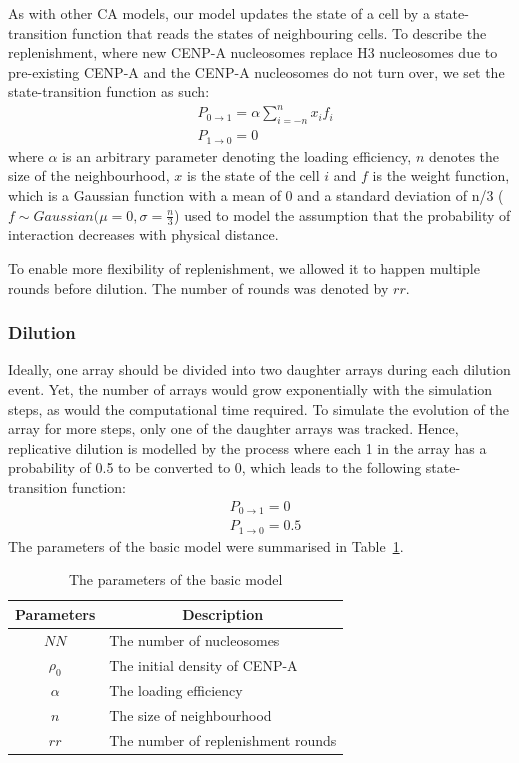 As with other CA models, our model updates the state of a cell by a state-transition function that reads the states of neighbouring cells. To describe the replenishment, where new CENP-A nucleosomes replace H3 nucleosomes due to pre-existing CENP-A and the CENP-A nucleosomes do not turn over, we set the state-transition function as such: 
\begin{align*}
    & P_{0\rightarrow 1}=\alpha\sum_{i=-n}^{n} x_if_i \\
    & P_{1\rightarrow 0}=0 
\end{align*}
where $\alpha$ is an arbitrary parameter denoting the loading efficiency, $n$ denotes the size of the neighbourhood, $x$ is the state of the cell $i$ and $f$ is the weight function, which is a Gaussian function with a mean of 0 and a standard deviation of n/3 ($f\sim Gaussian(\mu=0, \sigma=\frac{n}{3}$) used to model the assumption that the probability of interaction decreases with physical distance. 

To enable more flexibility of replenishment, we allowed it to happen multiple rounds before dilution. The number of rounds was denoted by $rr$. 

\subsubsection{Dilution}

Ideally, one array should be divided into two daughter arrays during each dilution event. Yet, the number of arrays would grow exponentially with the simulation steps, as would the computational time required. To simulate the evolution of the array for more steps, only one of the daughter arrays was tracked. Hence, replicative dilution is modelled by the process where each 1 in the array has a probability of 0.5 to be converted to 0, which leads to the following state-transition function: 
\begin{align*}
    & P_{0\rightarrow 1}=0 \\
    & P_{1\rightarrow 0}=0.5
\end{align*}
The parameters of the basic model were summarised in Table~\ref{tab:parameters}. 

\begin{table}[htbp]
\centering
\caption{The parameters of the basic model}
\label{tab:parameters}
\begin{tabular}{cl}
\hline
\textbf{Parameters} & \multicolumn{1}{c}{\textbf{Description}} \\ \hline
$NN$                  & The number of nucleosomes                \\
$\rho_{0}$               & The initial density of CENP-A            \\
$\alpha$               & The  loading efficiency                  \\
$n$                   & The size of neighbourhood                \\
$rr$                  & The number of replenishment rounds      \\ \hline
\end{tabular}
\end{table}

